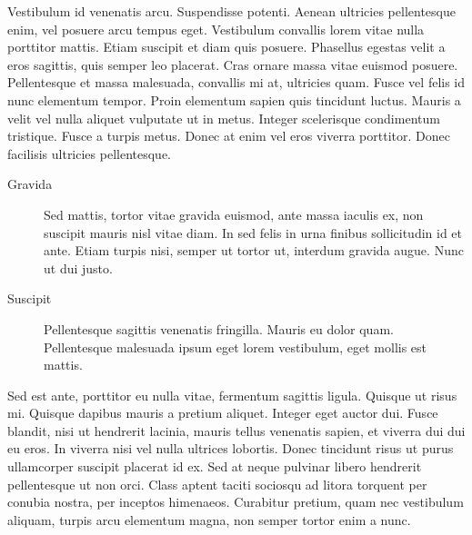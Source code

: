 \documentclass[polish,engineering]{wizthesis}
\begin{document}
\begin{appendices}
Vestibulum id venenatis arcu. Suspendisse potenti. Aenean ultricies pellentesque
enim, vel posuere arcu tempus eget. Vestibulum convallis lorem vitae nulla
porttitor mattis. Etiam suscipit et diam quis posuere. Phasellus egestas velit a
eros sagittis, quis semper leo placerat. Cras ornare massa vitae euismod
posuere. Pellentesque et massa malesuada, convallis mi at, ultricies quam. Fusce
vel felis id nunc elementum tempor. Proin elementum sapien quis tincidunt
luctus. Mauris a velit vel nulla aliquet vulputate ut in metus. Integer
scelerisque condimentum tristique. Fusce a turpis metus. Donec at enim vel eros
viverra porttitor. Donec facilisis ultricies pellentesque.
\begin{description}
  \item[Gravida] Sed mattis, tortor vitae gravida euismod, ante massa iaculis
  ex, non suscipit mauris nisl vitae diam. In sed felis in urna finibus
  sollicitudin id et ante. Etiam turpis nisi, semper ut tortor ut, interdum
  gravida augue. Nunc ut dui justo.
  \item[Suscipit] Pellentesque sagittis venenatis fringilla. Mauris eu dolor
  quam. Pellentesque malesuada ipsum eget lorem vestibulum, eget mollis est
  mattis.
\end{description}
Sed est ante, porttitor eu nulla vitae, fermentum sagittis ligula. Quisque ut
risus mi. Quisque dapibus mauris a pretium aliquet. Integer eget auctor dui.
Fusce blandit, nisi ut hendrerit lacinia, mauris tellus venenatis sapien, et
viverra dui dui eu eros. In viverra nisi vel nulla ultrices lobortis. Donec
tincidunt risus ut purus ullamcorper suscipit placerat id ex. Sed at neque
pulvinar libero hendrerit pellentesque ut non orci. Class aptent taciti sociosqu
ad litora torquent per conubia nostra, per inceptos himenaeos. Curabitur
pretium, quam nec vestibulum aliquam, turpis arcu elementum magna, non semper
tortor enim a nunc.

\end{appendices}
\end{document}
